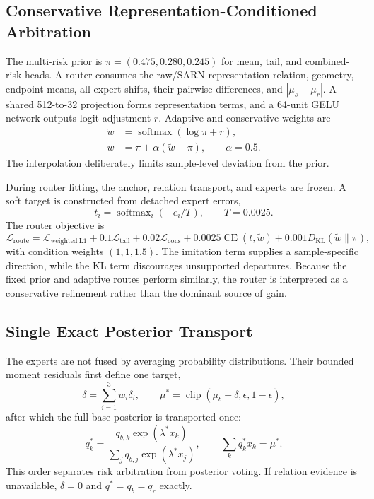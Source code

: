 \documentclass[electronics,article,submit,oneauthor]{Definitions/mdpi}
\begin{document}
\subsection{Conservative Representation-Conditioned Arbitration}
\label{subsec:router}

The multi-risk prior is $\pi=(0.475,0.280,0.245)$ for mean, tail, and combined-risk heads. A router consumes the raw/SARN representation relation, geometry, endpoint means, all expert shifts, their pairwise differences, and $|\mu_s-\mu_r|$. A shared 512-to-32 projection forms representation terms, and a 64-unit GELU network outputs logit adjustment $r$. Adaptive and conservative weights are
\begin{align}
\widetilde w&=\operatorname{softmax}(\log\pi+r),\\
w&=\pi+\alpha(\widetilde w-\pi),\qquad \alpha=0.5.
\label{eq:routing_weights}
\end{align}
The interpolation deliberately limits sample-level deviation from the prior.

During router fitting, the anchor, relation transport, and experts are frozen. A soft target is constructed from detached expert errors,
\begin{equation}
t_i=\operatorname{softmax}_i(-e_i/T),\qquad T=0.0025.
\label{eq:route_target}
\end{equation}
The router objective is
\begin{equation}
\mathcal L_{\mathrm{route}}=\mathcal L_{\mathrm{weighted\ L1}}+0.1\mathcal L_{\mathrm{tail}}
+0.02\mathcal L_{\mathrm{cons}}+0.0025\operatorname{CE}(t,\widetilde w)
+0.001D_{\mathrm{KL}}(\widetilde w\|\pi),
\label{eq:router_loss}
\end{equation}
with condition weights $(1,1,1.5)$. The imitation term supplies a sample-specific direction, while the KL term discourages unsupported departures. Because the fixed prior and adaptive routes perform similarly, the router is interpreted as a conservative refinement rather than the dominant source of gain.

\subsection{Single Exact Posterior Transport}
\label{subsec:single_transport}

The experts are not fused by averaging probability distributions. Their bounded moment residuals first define one target,
\begin{equation}
\delta=\sum_{i=1}^{3}w_i\delta_i,\qquad
\mu^*=\operatorname{clip}(\mu_b+\delta,\epsilon,1-\epsilon),
\label{eq:fused_target}
\end{equation}
after which the full base posterior is transported once:
\begin{equation}
q_k^*=\frac{q_{b,k}\exp(\lambda^*x_k)}{\sum_jq_{b,j}\exp(\lambda^*x_j)},
\qquad \sum_kq_k^*x_k=\mu^*.
\label{eq:final_transport}
\end{equation}
This order separates risk arbitration from posterior voting. If relation evidence is unavailable, $\delta=0$ and $q^*=q_b=q_r$ exactly.
\end{document}
